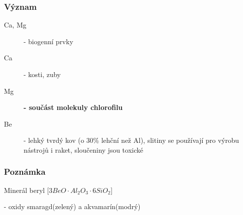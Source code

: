 \documentclass{article}
\begin{document}
    \subsubsection{Význam}
    \begin{description}
        \item[Ca, Mg] - biogenní prvky
        \item[Ca] - kosti, zuby
        \item[Mg] \textbf{- součást molekuly chlorofilu}
        \item[Be] - lehký tvrdý kov (o 30\% lehční než Al), slitiny se používají pro výrobu nástrojů i raket, sloučeniny jsou toxické
    \end{description}

    \subsubsection{Poznámka}
    Minerál beryl [$3BeO \cdot Al_2O_3 \cdot 6SiO_2$]

    - oxidy smaragd(zelený) a akvamarín(modrý)

\newpage
\newlength\origheight
\setlength\origheight{\textheight}
\end{document}
